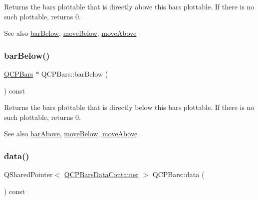 Returns the bars plottable that is directly above this bars plottable. If there is no such plottable, returns 0.

\begin{DoxySeeAlso}{See also}
\mbox{\hyperlink{class_q_c_p_bars_a1b58664864b141f45e02044a855b3213}{bar\+Below}}, \mbox{\hyperlink{class_q_c_p_bars_a69fc371346980f19177c3d1ecdad78ee}{move\+Below}}, \mbox{\hyperlink{class_q_c_p_bars_ac22e00a6a41509538c21b04f0a57318c}{move\+Above}} 
\end{DoxySeeAlso}
\mbox{\label{class_q_c_p_bars_a1b58664864b141f45e02044a855b3213}} 
\subsubsection{\texorpdfstring{bar\+Below()}{barBelow()}}
{\footnotesize\ttfamily \mbox{\hyperlink{class_q_c_p_bars}{Q\+C\+P\+Bars}} $\ast$ Q\+C\+P\+Bars\+::bar\+Below (\begin{DoxyParamCaption}{ }\end{DoxyParamCaption}) const\hspace{0.3cm}{\ttfamily [inline]}}

Returns the bars plottable that is directly below this bars plottable. If there is no such plottable, returns 0.

\begin{DoxySeeAlso}{See also}
\mbox{\hyperlink{class_q_c_p_bars_ab97f2acd9f6cb40d2cc3c33d278f0e78}{bar\+Above}}, \mbox{\hyperlink{class_q_c_p_bars_a69fc371346980f19177c3d1ecdad78ee}{move\+Below}}, \mbox{\hyperlink{class_q_c_p_bars_ac22e00a6a41509538c21b04f0a57318c}{move\+Above}} 
\end{DoxySeeAlso}
\mbox{\label{class_q_c_p_bars_a7e373a534d82e18ed27b3fafd1f08fae}} 
\subsubsection{\texorpdfstring{data()}{data()}}
{\footnotesize\ttfamily Q\+Shared\+Pointer$<$ \mbox{\hyperlink{class_q_c_p_data_container}{Q\+C\+P\+Bars\+Data\+Container}} $>$ Q\+C\+P\+Bars\+::data (\begin{DoxyParamCaption}{ }\end{DoxyParamCaption}) const\hspace{0.3cm}{\ttfamily [inline]}}

